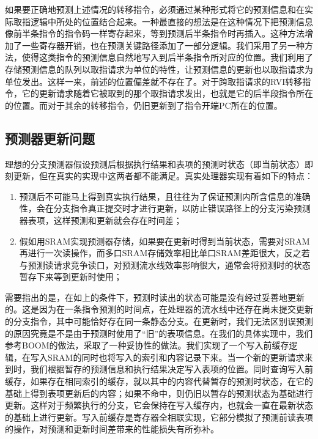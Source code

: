 如果要正确地预测上述情况的转移指令，必须通过某种形式将它的预测信息和在实际取指逻辑中所处的位置结合起来。一种最直接的想法是在这种情况下把预测信息像前半条指令的指令码一样寄存起来，等到预测后半条指令时再插入。这种方法增加了一些寄存器开销，也在预测关键路径添加了一部分逻辑。我们采用了另一种方法，使得这类指令的预测信息自然地写入到后半条指令所对应的位置。我们利用了存储预测信息的队列以取指请求为单位的特性，让预测信息的更新也以取指请求为单位发出。这样一来，前述的位置偏差就不存在了。对于跨取指请求的RVI转移指令，它的更新请求随着它被取到的那个取指请求发出，也就是它的后半段指令所在的位置。而对于其余的转移指令，仍旧更新到了指令开端PC所在的位置。


\subsection{预测器更新问题}
理想的分支预测器假设预测后根据执行结果和表项的预测时状态（即当前状态）即刻更新，但在真实的实现中这两者都不能满足。真实处理器实现有着如下的特点：
\begin{enumerate}
    \item 预测后不可能马上得到真实执行结果，且往往为了保证预测内所含信息的准确性，会在分支指令真正提交时才进行更新，以防止错误路径上的分支污染预测器表项，这样预测和更新就会存在时间差；
    \item 假如用SRAM实现预测器存储，如果要在更新时得到当前状态，需要对SRAM再进行一次读操作，而多口SRAM存储效率相比单口SRAM差距很大，反之若与预测读请求竞争读口，对预测流水线效率影响很大，通常会将预测时的状态暂存下来等到更新时使用；
\end{enumerate}

需要指出的是，在如上的条件下，预测时读出的状态可能是没有经过妥善地更新的。这是因为在一条指令预测的时间点，在处理器的流水线中还存在尚未提交更新的分支指令，其中可能恰好存在同一条静态分支。在更新时，我们无法区别误预测的原因究竟是不是由于预测时使用了“旧”的表项信息。在我们的具体实现中，我们参考BOOM的做法，采取了一种妥协性的做法。我们实现了一个写入前缓存逻辑，在写入SRAM的同时也将写入的索引和内容记录下来。当一个新的更新请求来到时，我们根据暂存的预测信息和执行结果决定写入表项的位置。同时查询写入前缓存，如果存在相同索引的缓存，就以其中的内容代替暂存的预测时状态，在它的基础上得到表项更新后的内容；如果不命中，则仍旧以暂存的预测状态为基础进行更新。这样对于频繁执行的分支，它会保持在写入缓存内，也就会一直在最新状态的基础上进行更新。写入前缓存是寄存器全相联实现，它部分模拟了预测前读表项的操作，对预测和更新时间差带来的性能损失有所弥补。
